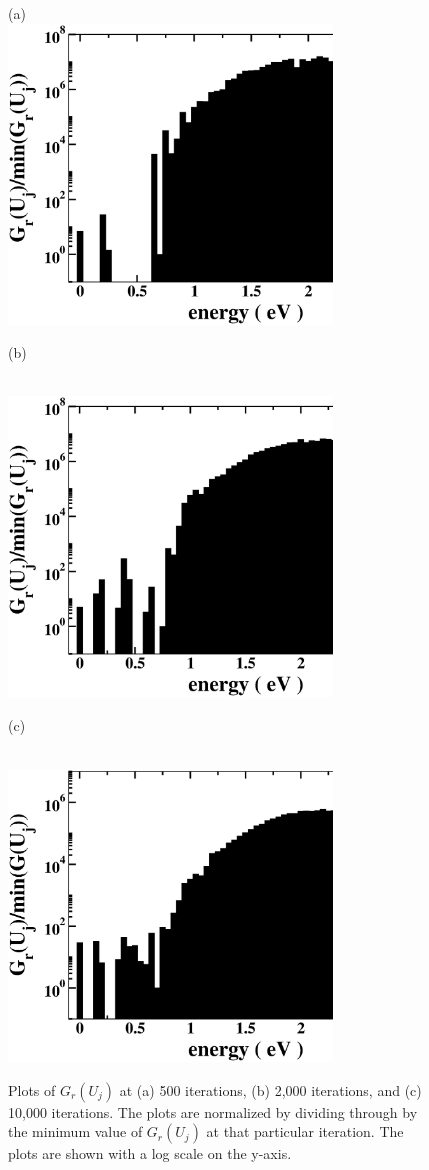 \documentclass[aps,pre,reprint,superscriptaddress,showkeys]{revtex4-2}
\begin{document}
\begin{figure}[h!]
(a)\\
\includegraphics[width=8.6cm]{fig7a.eps}
\centerline{(b)}\\
\includegraphics[width=8.6cm]{fig7b.eps}
\centerline{(c)}\\
\includegraphics[width=8.6cm]{fig7c.eps}
\caption{Plots of $G_r(U_j)$ at (a) 500 iterations, (b) 2,000 iterations, and (c) 10,000 iterations. The plots are normalized by dividing through by the minimum value of $G_r(U_j)$ at that particular iteration. The plots are shown with a log scale on the y-axis.  \label{converge_GE}}
\end{figure}
\end{document}
